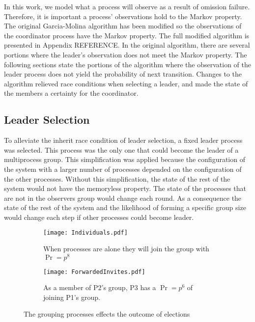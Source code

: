 In this work, we model what a process will observe as a result of omission failure.
Therefore, it is important a process' observations hold to the Markov property.
The original Garcia-Molina algorithm has been modified so the observations of the coordinator process have the Markov property.
The full modified algorithm is presented in Appendix REFERENCE.
In the original algorithm, there are several portions where the leader's observation does not meet the Markov property.
The following sections state the portions of the algorithm where the observation of the leader process does not yield the probability of next transition.
Changes to the algorithm relieved race conditions when selecting a leader, and made the state of the members a certainty for the coordinator.

\subsection{Leader Selection}

To alleviate the inherit race condition of leader selection, a fixed leader process was selected.
This process was the only one that could become the leader of a multiprocess group.
This simplification was applied because the configuration of the system with a larger number of processes depended on the configuration of the other processes.
Without this simplification, the state of the rest of the system would not have the memoryless property.
The state of the processes that are not in the observers group would change each round.
As a consequence the state of the rest of the system and the likelihood of forming a specific group size would change each step if other processes could become leader.

\begin{figure}
\begin{subfigure}{0.45\textwidth}
\texttt{[image: Individuals.pdf]}
\caption{When processes are alone they will join the group with $\Pr=p^8$} \label{fig:groupinga}
\end{subfigure}
\hspace*{\fill} %
\begin{subfigure}{0.45\textwidth}
\texttt{[image: ForwardedInvites.pdf]}
\caption{As a member of P2's group, P3 has a $\Pr=p^6$ of joining P1's group.} \label{fig:groupingb}
\end{subfigure}
\caption{The grouping processes effects the outcome of elections} \label{fig:grouping}
\end{figure}

